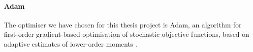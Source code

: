 \paragraph*{Adam}

The optimiser we have chosen for this thesis project is Adam, {an algorithm for 
	first-order gradient-based optimisation of stochastic objective functions, based 
	on adaptive estimates of lower-order moments} \cite[][]{kingma2014adam, 
	loshchilov2017decoupled}. 

\fi